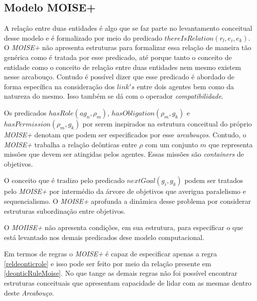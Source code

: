 \subsection{Modelo MOISE+}

A relação entre duas entidades é algo que se faz parte no levantamento conceitual desse modelo e é formalizado por meio do predicado $thereIsRelation(r_l,e_i,e_k)$. O \textit{MOISE+} não apresenta estruturas para formalizar essa relação de maneira tão genérica como é tratada por esse predicado, até porque tanto o conceito de entidade como o conceito de relação entre duas entidades nem mesmo existem nesse arcabouço. Contudo é possível dizer que esse predicado é abordado de forma específica na consideração dos $link's$ entre dois agentes bem como da natureza do mesmo. Isso também se dá com o operador \textit{compatibilidade}. 

Os predicados $hasRole(ag_n,\rho_m)$, $hasObligation(\rho_m,g_k)$ e $hasPermission(\rho_m,g_k)$ por serem inspirados na estrutura conceitual do próprio \textit{MOISE+} denotam que podem ser especificados por esse \textit{arcabouços}. Contudo, o \textit{MOISE+} trabalha a relação deônticas entre $\rho$ com um conjunto $m$ que representa missões que devem ser atingidas pelos agentes. Essas missões são \textit{containers} de objetivos.

O conceito que é tradizo pelo predicado $nextGoal(g_i,g_k)$ podem ser tratados pelo \textit{MOISE+} por intermédio da árvore de objetivos que averigua paralelismo e sequencialismo. O \textit{MOISE+} aprofunda a dinâmica desse problema por considerar estruturas subordinação entre objetivos. 

O \textit{MOIISE+} não apresenta condições, em sua estrutura, para especificar o que está levantado nos demais predicados dese modelo computacional. 

Em termos de regras o \textit{MOISE+} é capaz de especificar apenas a regra \ref{reldeonticrole} e isso pode ser feito por meio da relação presente em \ref{deonticRuleMoise}. No que tange as demais regras não foi possível encontrar estruturas conceituais que apresentam capacidade de lidar com as mesmas dentro deste \textit{Arcabouço}.  